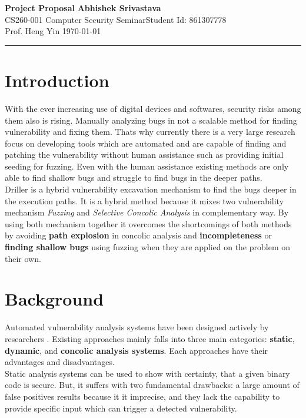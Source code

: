 \documentclass[a4paper, 11pt]{article}
\begin{document}
\noindent
\large\textbf{Project Proposal} \hfill \textbf{Abhishek Srivastava} \\
\normalsize CS260-001 Computer Security Seminar\hfill Student Id: 861307778 \\
Prof. Heng Yin \hfill \today \\

\hrule

\section*{Introduction}
With the ever increasing use of digital devices and softwares, security risks among them also is rising. Manually analyzing bugs in not a scalable method for finding vulnerability and fixing them. Thats why currently there is a very large research focus on developing tools which are automated and are capable of finding and patching the vulnerability without human assistance such as providing initial seeding for fuzzing. Even with the human assistance existing methods are only able to find shallow bugs and struggle to find bugs in the deeper paths.\\

Driller is a hybrid vulnerability excavation mechanism to find the bugs deeper in the execution paths. It is a hybrid method because it mixes two vulnerability mechanism \emph{Fuzzing} and \emph{Selective Concolic Analysis} in complementary way. By using both mechanism together it overcomes the shortcomings of both methods by avoiding \textbf{path explosion} in concolic analysis and \textbf{incompleteness} or \textbf{finding shallow bugs} using fuzzing when they are applied on the problem on their own.

\section*{Background}

Automated vulnerability analysis systems have been designed actively by researchers . Existing approaches mainly falls into three main categories: \textbf{static}, \textbf{dynamic}, and \textbf{concolic analysis systems}. Each approaches have their advantages and disadvantages.\\

Static analysis systems can be used to show with certainty, that a given binary code is secure. But, it suffers with two fundamental drawbacks: a large amount of false positives results because it it imprecise, and they lack the capability to provide specific input which can trigger a detected vulnerability.\\ 
\end{document}
